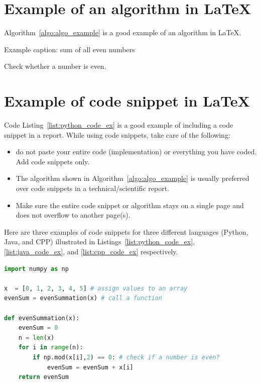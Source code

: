 \section{Example of an algorithm in \LaTeX}
Algorithm~\ref{algo:algo_example} is a good example of an algorithm in \LaTeX.  
\begin{algorithm}
    \caption{Example caption: sum of all even numbers}
    \label{algo:algo_example}
    \begin{algorithmic}[1]
        \Statex
          \Comment Check whether a number is even.
        \EndIf
        \EndFor
        \State {}
        \EndFunction
    \end{algorithmic}
\end{algorithm}
 
\section{Example of code snippet  in \LaTeX}

Code Listing~\ref{list:python_code_ex} is a good example of including a code snippet in a report. While using code snippets, take care of the following:
\begin{itemize}
    \item do not paste your entire code (implementation) or everything you have coded. Add code snippets only. 
    \item The algorithm shown in Algorithm~\ref{algo:algo_example} is usually preferred over code snippets in a technical/scientific report. 
    \item Make sure the entire code snippet or algorithm stays on a single page and does not overflow to another page(s).  
\end{itemize}

Here are three examples of code snippets for three different languages (Python, Java, and CPP) illustrated in Listings~\ref{list:python_code_ex}, \ref{list:java_code_ex}, and \ref{list:cpp_code_ex} respectively.  

\begin{lstlisting}[language=Python, caption={Code snippet in \LaTeX ~and  this is a Python code example}, label=list:python_code_ex]
import numpy as np

x  = [0, 1, 2, 3, 4, 5] # assign values to an array
evenSum = evenSummation(x) # call a function

def evenSummation(x):
    evenSum = 0
    n = len(x)
    for i in range(n):
        if np.mod(x[i],2) == 0: # check if a number is even?
            evenSum = evenSum + x[i]
    return evenSum
\end{lstlisting}

